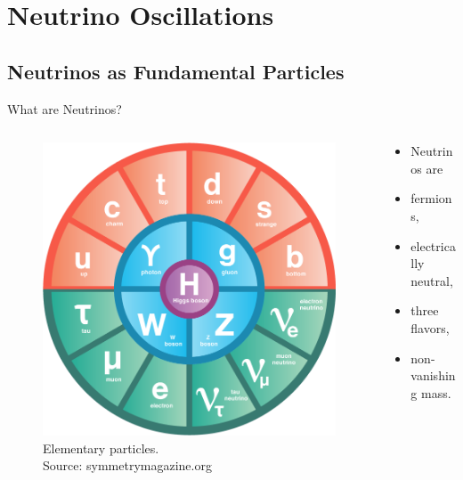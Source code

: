 \section{Neutrino Oscillations}

\subsection{Neutrinos as Fundamental Particles}

\begin{frame}{What are Neutrinos?}
  \begin{minipage}[\textheight]{\textwidth}
  \begin{columns}[T]

  \begin{column}{0.6\textwidth}
  \begin{figure}
  \includegraphics[width=0.9\linewidth,height=0.8\textheight,keepaspectratio]{assets/standard-model}
  \caption*{Elementary particles. \\ Source: symmetrymagazine.org} %
  \end{figure}
  \end{column}

  \begin{column}{0.4\textwidth}


      \begin{itemize}
      \item[] Neutrinos are
      \item fermions,
      \item electrically neutral,
      \item three flavors,
      \item non-vanishing mass.
      \end{itemize}




\end{column}
\end{columns}
\end{minipage}
\end{frame}

